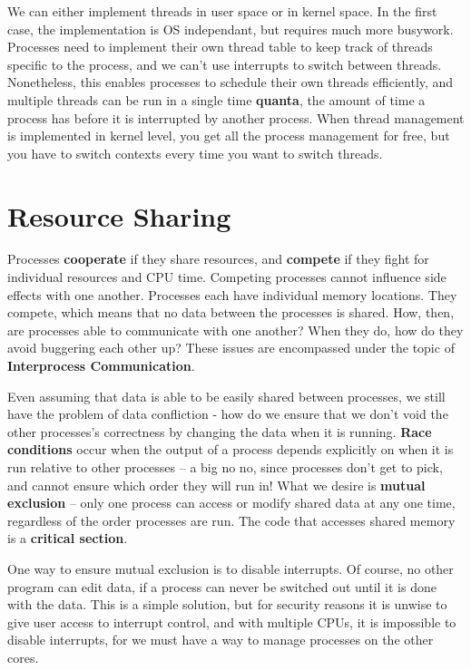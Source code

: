 We can either implement threads in user space or in kernel space. In the first case, the implementation is OS independant, but requires much more busywork. Processes need to implement their own thread table to keep track of threads specific to the process, and we can't use interrupts to switch between threads. Nonetheless, this enables processes to schedule their own threads efficiently, and multiple threads can be run in a single time {\bf quanta}, the amount of time a process has before it is interrupted by another process. When thread management is implemented in kernel level, you get all the process management for free, but you have to switch contexts every time you want to switch threads.

\section{Resource Sharing}


Processes {\bf cooperate} if they share resources, and {\bf compete} if they fight for individual resources and CPU time. Competing processes cannot influence side effects with one another. Processes each have individual memory locations. They compete, which means that no data between the processes is shared. How, then, are processes able to communicate with one another? When they do, how do they avoid buggering each other up? These issues are encompassed under the topic of {\bf Interprocess Communication}.

Even assuming that data is able to be easily shared between processes, we still have the problem of data confliction - how do we ensure that we don't void the other processes's correctness by changing the data when it is running. {\bf Race conditions} occur when the output of a process depends explicitly on when it is run relative to other processes -- a big no no, since processes don't get to pick, and cannot ensure which order they will run in! What we desire is {\bf mutual exclusion} -- only one process can access or modify shared data at any one time, regardless of the order processes are run. The code that accesses shared memory is a {\bf critical section}.

One way to ensure mutual exclusion is to disable interrupts. Of course, no other program can edit data, if a process can never be switched out until it is done with the data. This is a simple solution, but for security reasons it is unwise to give user access to interrupt control, and with multiple CPUs, it is impossible to disable interrupts, for we must have a way to manage processes on the other cores.

